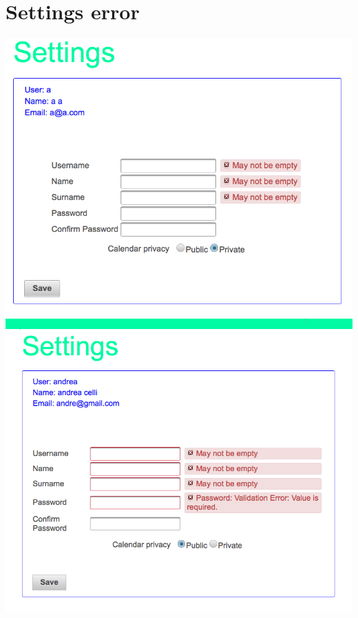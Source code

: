\documentclass[10pt,a4paper,titlepage]{article}
\begin{document}
\section{Settings error}
\begin{center}
\includegraphics[width=0.7\linewidth]{./images/34_error_settings_1}
\includegraphics[width=0.7\linewidth]{./images/35_error_settings_2}
\end{center}
\end{document}
